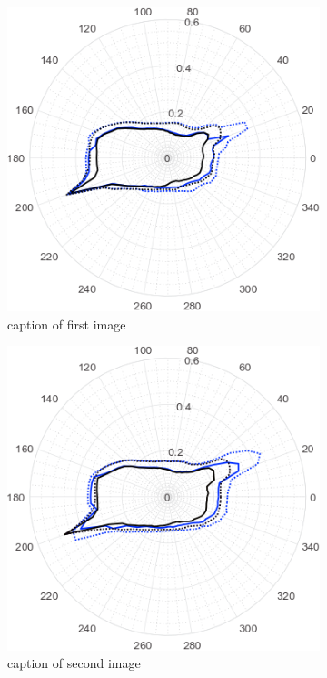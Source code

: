 \begin{figure}
     \centering
    \begin{subfigure}[t]{0.49\textwidth}
     \centering
        \includegraphics[width=0.8\linewidth]{STYLESTUFF/round00Ang.png}
        \caption{caption of first image}
    \end{subfigure}
    \begin{subfigure}[t]{0.49\textwidth}
     \centering
       \includegraphics[width=0.8\linewidth]{STYLESTUFF/round01Ang.png}
        \caption{caption of second image}
    \end{subfigure}
    \par\bigskip
   \begin{subfigure}[t]{0.49\textwidth}

\end{subfigure}
\end{figure}
